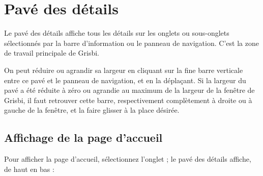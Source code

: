 \newpage


\section{Pavé des détails\label{home-details}}


Le pavé des détails affiche tous les détails sur les onglets ou sous-onglets sélectionnés par la barre d'information ou le panneau de navigation. C'est la zone de travail principale de Grisbi.

On peut réduire ou agrandir sa largeur en cliquant sur la fine barre verticale entre ce pavé et le panneau de navigation, et en la déplaçant. Si la largeur du pavé a été réduite à zéro ou agrandie au maximum de la largeur de la fenêtre de Grisbi, il faut retrouver cette barre, respectivement complètement à droite ou à gauche de la fenêtre, et la faire glisser à la place désirée. 
 
 
\subsection{Affichage de la page d'accueil\label{home-details-homepage}}

Pour afficher la page d'accueil, sélectionnez l'onglet  ; le pavé des détails affiche, de haut en bas :

